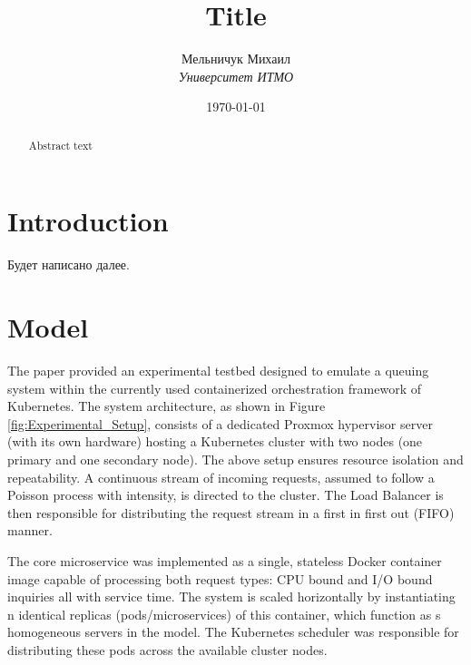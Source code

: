\documentclass[12pt]{article}
\title{Title}
\author{
  Мельничук Михаил\\ {\itshape\large Университет ИТМО}
}
\date{\today}
\begin{document}
\maketitle
\begin{abstract}
  Abstract text

  \par\vspace{-2.5mm}
\end{abstract}

\newpage

\section{Introduction}

Будет написано далее.

\section{Model}


The paper \cite{мельничук2026анализ} provided an experimental testbed designed to emulate a queuing system within the currently used containerized orchestration framework of Kubernetes. The system architecture, as shown in Figure \ref{fig:Experimental_Setup}, consists of a dedicated Proxmox hypervisor server (with its own hardware) hosting a Kubernetes cluster with two nodes (one primary and one secondary node). The above setup ensures resource isolation and repeatability. A continuous stream of incoming requests, assumed to follow a Poisson process with intensity, is directed to the cluster. The Load Balancer is then responsible for distributing the request stream in a first in first out (FIFO) manner.

The core microservice was implemented as a single, stateless Docker container image capable of processing both request types: CPU bound and I/O bound inquiries all with service time. The system is scaled horizontally by instantiating n identical replicas (pods/microservices) of this container, which function as s homogeneous servers in the model. The Kubernetes scheduler was responsible for distributing these pods across the available cluster nodes.
\end{document}
